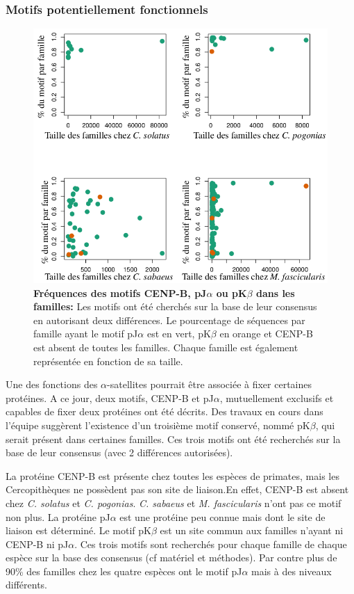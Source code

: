 \documentclass[12pt,a4paper]{article}
\begin{document}
			\subsubsection{Motifs potentiellement fonctionnels}
\begin{figure}
	\center	
	\includegraphics[scale=0.4]{img/graphique_motifs.png}
	\caption{\textbf{Fréquences des motifs CENP-B, pJ$\alpha$ ou pK$\beta$ dans les familles:} Les motifs ont été cherchés sur la base de leur consensus en autorisant deux différences. Le pourcentage de séquences par famille ayant le motif pJ$\alpha$ est en vert, pK$\beta$ en orange et CENP-B est absent de toutes les familles. Chaque famille est également représentée en fonction de sa taille.
	\label{fig:motif}} 
\end{figure}
			Une des fonctions des $\alpha$-satellites pourrait être associée à fixer certaines protéines. A ce jour, deux motifs, CENP-B et pJ$\alpha$, mutuellement exclusifs et capables de fixer deux protéines ont été décrits. Des travaux en cours dans l'équipe suggèrent l'existence d'un troisième motif conservé, nommé pK$\beta$, qui serait présent dans certaines familles. Ces trois motifs ont été recherchés sur la base de leur consensus (avec 2 différences autorisées).
			
			La protéine CENP-B est présente chez toutes les espèces de primates, mais les Cercopithèques ne possèdent pas son site de liaison.En effet, CENP-B est absent chez \textit{C. solatus} et \textit{C. pogonias}. \textit{C. sabaeus} et \textit{M. fascicularis} n'ont pas ce motif non plus.  La protéine pJ$\alpha$ est une protéine peu connue mais dont le site de liaison est déterminé. Le motif pK$\beta$ est un site commun aux familles n'ayant ni CENP-B ni pJ$\alpha$. Ces trois motifs sont recherchés pour chaque famille de chaque espèce sur la base des consensus (cf matériel et méthodes). Par contre plus de 90\% des familles chez les quatre espèces ont le motif pJ$\alpha$ mais à des niveaux différents.
			
\end{document}
